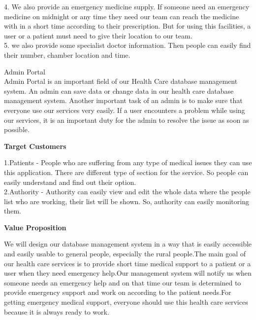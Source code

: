 \documentclass[a4paper,11pt]{paper}
\begin{document}
4. We also provide an emergency medicine supply. If someone need an emergency medicine on midnight or any time they need our team can reach the medicine with in a short time according to their prescription. But for using this facilities, a user or a patient must need to give their location to our team.\\

5. we also provide some specialist doctor information. Then people can easily find their number, chamber location and time. 

Admin Portal\\

Admin Portal is an important field of our  Health Care database management system. An admin can save data or change data in our health care database management system. Another important task of an admin is to make sure that everyone use our services very easily. If a user encounters a problem while using our services, it is an important duty for the admin to resolve the issue as soon as possible.\\

\vspace{2\baselineskip}
   
 {\LARGE \textbf{Target Customers} \\}
 \vspace{.5\baselineskip} 
 
 1.Patients - People who are suffering from any type of medical issues they can use this application. There are different type of section for the service. So people can easily understand and find out their option. \\
 
 2.Authority - Authority can easily view and edit the whole data where the people list who are working, their list will be shown. So, authority can easily monitoring them.\\
    
  \vspace{2\baselineskip}
   
 {\LARGE \textbf{Value Proposition} \\}
 \vspace{.5\baselineskip} 
 
 We will design our database management system in a way that is easily accessible and easily usable to general people, especially the rural people.The main goal of our health care services is to provide short time medical support to a patient or a user when they need emergency help.Our management system will notify us when someone needs an emergency help and on that time our team is determined to provide emergency support and work on according to the patient needs.For getting emergency medical support, everyone should use this health care services because it is always ready to work.  
  
\end{document}
